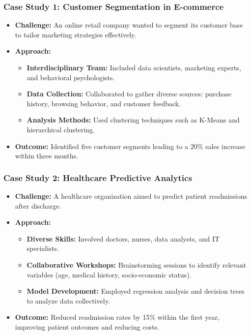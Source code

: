 \documentclass{beamer}
\begin{document}
\begin{frame}[fragile]
    \frametitle{Case Study 1: Customer Segmentation in E-commerce}
    \begin{itemize}
        \item \textbf{Challenge:} An online retail company wanted to segment its customer base to tailor marketing strategies effectively.
        \item \textbf{Approach:}
        \begin{itemize}
            \item \textbf{Interdisciplinary Team:} Included data scientists, marketing experts, and behavioral psychologists.
            \item \textbf{Data Collection:} Collaborated to gather diverse sources: purchase history, browsing behavior, and customer feedback.
            \item \textbf{Analysis Methods:} Used clustering techniques such as K-Means and hierarchical clustering.
        \end{itemize}
        \item \textbf{Outcome:} Identified five customer segments leading to a 20\% sales increase within three months.
    \end{itemize}
\end{frame}

\begin{frame}[fragile]
    \frametitle{Case Study 2: Healthcare Predictive Analytics}
    \begin{itemize}
        \item \textbf{Challenge:} A healthcare organization aimed to predict patient readmissions after discharge.
        \item \textbf{Approach:}
        \begin{itemize}
            \item \textbf{Diverse Skills:} Involved doctors, nurses, data analysts, and IT specialists.
            \item \textbf{Collaborative Workshops:} Brainstorming sessions to identify relevant variables (age, medical history, socio-economic status).
            \item \textbf{Model Development:} Employed regression analysis and decision trees to analyze data collectively.
        \end{itemize}
        \item \textbf{Outcome:} Reduced readmission rates by 15\% within the first year, improving patient outcomes and reducing costs.
    \end{itemize}
\end{frame}
\end{document}

